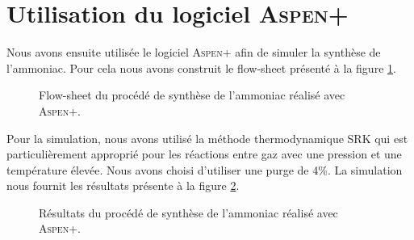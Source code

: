
\section{Utilisation du logiciel \textsc{Aspen+}}
Nous avons ensuite utilisée le logiciel \textsc{Aspen+}
afin de simuler la synthèse de l'ammoniac. Pour cela
nous avons construit le flow-sheet présenté à la figure
\ref{fig:flow-sheet-aspen}. 

\begin{figure}
	\centering
	\caption{Flow-sheet du procédé de synthèse de l'ammoniac
	réalisé avec \textsc{Aspen+}.}
	\label{fig:flow-sheet-aspen}
\end{figure}

Pour la simulation, nous avons utilisé la méthode
thermodynamique \textsc{SRK} qui est particulièrement
approprié pour les réactions entre gaz avec une pression
et une température élevée. Nous avons choisi d'utiliser
une purge de 4\%. La simulation nous fournit les résultats
présente à la figure \ref{fig:resultats-aspen}.

\begin{figure}
	\centering
	\caption{Résultats du procédé de synthèse de l'ammoniac
	réalisé avec \textsc{Aspen+}.}
	\label{fig:resultats-aspen}
\end{figure}

